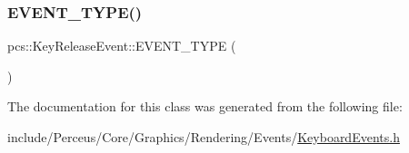 \subsubsection{\texorpdfstring{E\+V\+E\+N\+T\+\_\+\+T\+Y\+P\+E()}{EVENT\_TYPE()}}
{\footnotesize\ttfamily pcs\+::\+Key\+Release\+Event\+::\+E\+V\+E\+N\+T\+\_\+\+T\+Y\+PE (\begin{DoxyParamCaption}\item[{\hyperlink{namespacepcs_a12954f53e3d7d6a8765fd723e1ce8db4a17ee17cec34ff017c382ba1ce8dc4cdc}{Key\+Release}}]{ }\end{DoxyParamCaption})}



The documentation for this class was generated from the following file\+:\begin{DoxyCompactItemize}
\item 
include/\+Perceus/\+Core/\+Graphics/\+Rendering/\+Events/\hyperlink{KeyboardEvents_8h}{Keyboard\+Events.\+h}\end{DoxyCompactItemize}
